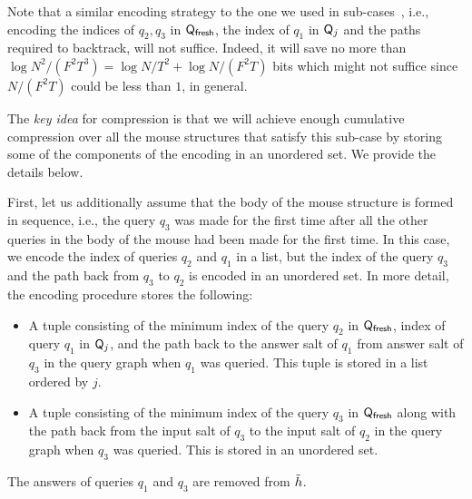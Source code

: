 {\begin{remark}
Note that a similar encoding strategy to the one we used in sub-cases~, i.e., encoding the indices of $q_2,q_3$ in $\mathsf{Q}_\textsf{fresh}$, the index of $q_1$ in $\mathsf{Q}_j$ and the paths required to backtrack,  will not suffice. Indeed, it will save no more than $\log N^2/(F^2T^3)=\log N/T^2+\log N/(F^2T)$ bits which might not suffice since $N/(F^2T)$ could be less than $1$, in general.
\end{remark}

The \emph{key idea} for compression is that we will achieve enough cumulative compression over all the mouse structures that satisfy this sub-case by storing some of the components of the encoding in an unordered set. We provide the details below.

First, let us additionally assume that the body of the mouse structure is formed in sequence, i.e., the query $q_3$ was made for the first time after all the other queries in the body of the mouse had been made for the first time. 
In this case, we encode the index of queries $q_2$ and $q_1$ in a list, but the index of the query $q_3$ and the path back from $q_3$ to $q_2$ is encoded in an unordered set. In more detail, the encoding procedure stores the following:
\begin{itemize}
  \item A tuple consisting of the minimum index of the query $q_2$ in $\mathsf{Q}_\textsf{fresh}$, index of query $q_1$ in $\mathsf{Q}_j$, and the path back to the answer salt of $q_1$ from answer salt of $q_3$ in the query graph when $q_1$ was queried. This tuple is stored in a list ordered by $j$.
  \item A tuple consisting of the minimum index of the query $q_3$ in $\mathsf{Q}_\textsf{fresh}$ along with the path back from the input salt of $q_3$ to the input salt of $q_2$ in the query graph when $q_3$ was queried. This is stored in an unordered set.
\end{itemize}
The answers of queries $q_1$ and $q_3$ are removed from $\tilde{h}$.

}
